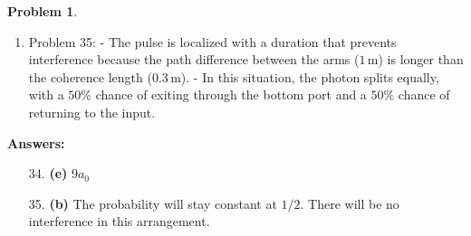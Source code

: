 \documentclass[12pt]{article}
\theoremstyle{definition} %
\newtheorem{problem}{Problem}
\theoremstyle{plain} %
\begin{document}
\begin{problem}
\begin{enumerate}
        \item Problem 35:
        - The pulse is localized with a duration that prevents interference because the path difference between the arms (\(1 \, \text{m}\)) is longer than the coherence length (\(0.3 \, \text{m}\)).
        - In this situation, the photon splits equally, with a \(50\%\) chance of exiting through the bottom port and a \(50\%\) chance of returning to the input.
    \end{enumerate}
    
    \textbf{Answers:}
    \begin{enumerate}
        \item[34.] \textbf{(e)} \(9a_0\)
        \item[35.] \textbf{(b)} The probability will stay constant at \(1/2\). There will be no interference in this arrangement.
    \end{enumerate}
\end{problem}
    
    
\end{document}
